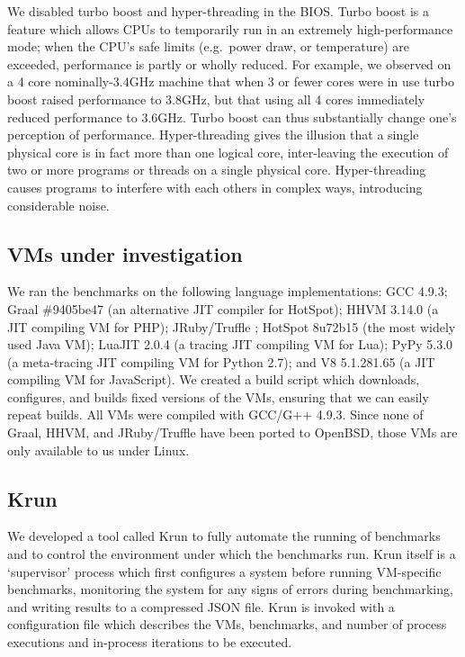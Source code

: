 \documentclass[preprint,numbers,10pt]{sigplanconf}
\newcommand{\krun}{Krun\xspace}
\begin{document}
We disabled turbo boost and hyper-threading in the BIOS. Turbo boost is a
feature which allows CPUs to temporarily run in an extremely high-performance
mode; when the CPU's safe limits (e.g.~power draw, or temperature) are exceeded,
performance is partly or wholly reduced. For example, we observed on a 4 core
nominally-3.4GHz machine that when 3 or fewer cores were in use turbo boost
raised performance to 3.8GHz, but that using all 4 cores immediately reduced
performance to 3.6GHz. Turbo boost can thus substantially change one's
perception of performance. Hyper-threading gives the illusion that a single
physical core is in fact more than one logical core, inter-leaving the
execution of two or more programs or threads on a single physical core.
Hyper-threading causes programs to interfere
with each others in complex ways, introducing considerable noise.


\subsection{VMs under investigation}

We ran the benchmarks on the following language implementations: GCC 4.9.3;
Graal \#9405be47 (an alternative JIT compiler for HotSpot); HHVM 3.14.0 (a JIT
compiling VM for PHP); JRuby/Truffle ; HotSpot 8u72b15 (the most widely used Java
VM); LuaJIT 2.0.4 (a tracing JIT compiling VM for Lua); PyPy 5.3.0 (a
meta-tracing JIT compiling VM for Python 2.7); and V8 5.1.281.65 (a JIT
compiling VM for JavaScript). We created a build script which downloads,
configures, and builds fixed versions of the VMs, ensuring that we can easily
repeat builds. All VMs were compiled with GCC/G++ 4.9.3. Since none of Graal,
HHVM, and JRuby/Truffle have been ported to OpenBSD, those VMs are only
available to us under Linux.


\subsection{\krun}
\label{krun}

We developed a tool called \krun to fully automate the running of benchmarks
and to control the environment under which the benchmarks run. \krun itself is a
`supervisor' process which first configures a system before running VM-specific
benchmarks, monitoring the system for any signs of errors during benchmarking,
and writing results to a compressed JSON file. \krun is invoked with a
configuration file which describes the VMs, benchmarks, and number of process
executions and in-process iterations to
be executed.
\end{document}
